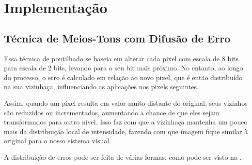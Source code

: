\section{Implementação} \label{sec:impl}

\subsection{Técnica de Meios-Tons com Difusão de Erro}

    Essa técnica de pontilhado se baseia em alterar cada pixel com escala de 8 bits para escala de 2 bits, levando para o seu bit mais próximo. No entanto, ao longo do processo, o erro é calculado em relação ao novo pixel, que é então distribuído na sua vizinhaça, influenciando as aplicações nos pixels seguintes.

    Assim, quando um pixel resulta em valor muito distante do original, seus vizinhos são reduzidos ou incrementados, aumentando a chance de que eles sejam transformados para outro nível. Isso faz com que a vizinhaça mantenha um pouco mais da distribuição local de intensidade, fazendo com que imagem fique similar à original para o nosso sistema visual.

    A distribuição de erros pode ser feita de várias formas, como pode ser visto na .

%     





